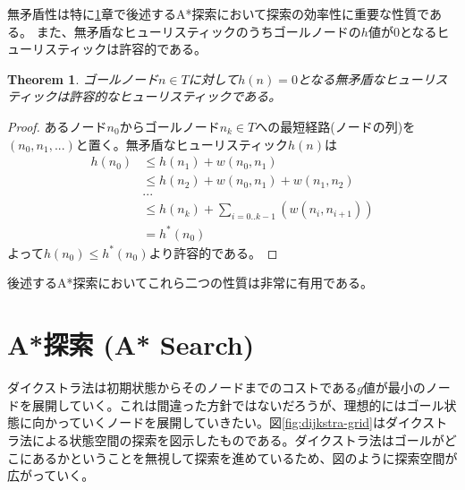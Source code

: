 \documentclass[10pt]{book}
\newtheorem{theorem}{Theorem}
\newcommand{\TODO}{{\bf TODO}}
\begin{document}
無矛盾性は特に\ref{sec:astar-search}章で後述するA*探索において探索の効率性に重要な性質である。
また、無矛盾なヒューリスティックのうちゴールノードの$h$値が0となるヒューリスティックは許容的である。

\begin{theorem}
ゴールノード$n \in T$に対して$h(n) = 0$となる無矛盾なヒューリスティックは許容的なヒューリスティックである。
\end{theorem}

\begin{proof}

あるノード$n_0$からゴールノード$n_k \in T$への最短経路(ノードの列)を$(n_0, n_1,...)$と置く。無矛盾なヒューリスティック$h(n)$は
\begin{align}
	h(n_0) &\leq h(n_1) + w(n_0, n_1) \\
			&\leq h(n_2) + w(n_0, n_1) + w(n_1, n_2) \\
			&... \\
			&\leq h(n_k) + \sum_{i=0..k-1}(w(n_i,n_{i+1})) \\
			&= h^*(n_0)
\end{align}
よって$h(n_0) \leq h^*(n_0)$より許容的である。

\end{proof}

後述するA*探索においてこれら二つの性質は非常に有用である。


\section{A*探索 (A* Search)}
\label{sec:astar-search}

ダイクストラ法は初期状態からそのノードまでのコストである$g$値が最小のノードを展開していく。これは間違った方針ではないだろうが、理想的にはゴール状態に向かっていくノードを展開していきたい。図\ref{fig:dijkstra-grid}はダイクストラ法による状態空間の探索を図示したものである。ダイクストラ法はゴールがどこにあるかということを無視して探索を進めているため、図のように探索空間が広がっていく。
\end{document}
